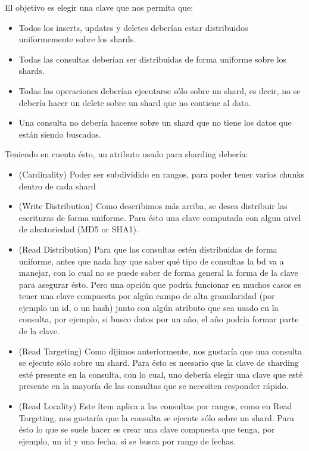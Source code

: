 \documentclass[a4paper, 10pt, twoside]{article}
\begin{document}
El objetivo es elegir una clave que nos permita que:

\begin{itemize}
\item Todos los inserts, updates y deletes deber\'ian estar distribuidos uniformemente sobre los shards.
\item Todas las consultas deber\'ian ser distribuidas de forma uniforme sobre los shards.
\item  Todas las operaciones deber\'ian ejecutarse s\'olo sobre un shard, es decir, no se deber\'ia hacer un delete sobre un shard que no contiene al dato.
\item  Una consulta no deber\'ia hacerse sobre un shard que no tiene los datos que est\'an siendo buscados.
\end{itemize}

Teniendo en cuenta \'esto, un atributo usado para sharding deber\'ia:

\begin{itemize}
\item (Cardinality) Poder ser subdividido en rangos, para poder tener varios chunks dentro de cada shard
\item (Write Distribution) Como describimos m\'as arriba, se desea distribuir las escrituras de forma uniforme. Para \'esto una clave computada con algun nivel de aleatoriedad (MD5 or SHA1).
\item (Read Distribution) Para que las consultas est\'en distribuidas de forma uniforme, antes que nada hay que saber qu\'e tipo de consultas la bd va a manejar, con lo cual no se puede saber de forma general la forma de la clave para asegurar \'esto. Pero una opci\'on que podr\'ia funcionar en muchos casos es tener una clave compuesta por alg\'un campo de alta granularidad (por ejemplo un id, o un hash) junto con alg\'un atributo que sea usado en la consulta, por ejemplo, si busco datos por un a\~no, el a\~no podr\'ia formar parte de la clave.
\item (Read Targeting) Como dijimos anteriormente, nos gustar\'ia que una consulta se ejecute s\'olo sobre un shard. Para \'esto es neesario que la clave de sharding est\'e presente en la consulta, con lo cual, uno deber\'ia elegir una clave que est\'e presente en la mayor\'ia de las consultas que se necesiten responder r\'apido.
\item (Read Locality) Este \'item aplica a las consultas por rangos, como en Read Targeting, nos gustar\'ia que la consulta se ejecute s\'olo sobre un shard. Para \'esto lo que se suele hacer es crear una clave compuesta que tenga, por ejemplo, un id y una fecha, si se busca por rango de fechas. 
\end{itemize}
\end{document}
